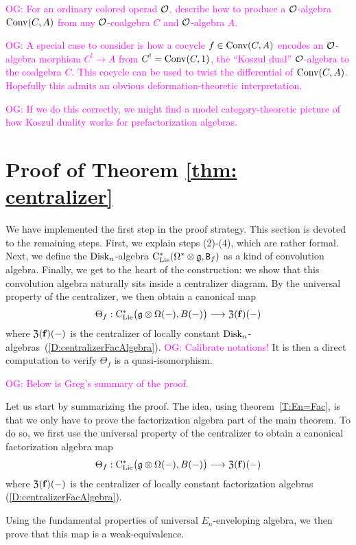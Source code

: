 \documentclass[11pt]{amsart}
\numberwithin{equation}{section}
\def\owen{\textcolor{magenta}{OG: }\textcolor{magenta}}
\begin{document}
\def\conv{{\rm Conv}}

\owen{For an ordinary colored operad $\mathcal O$, describe how to produce a $\mathcal O$-algebra $\conv(C,A)$ from any $\mathcal O$-coalgebra $C$ and $\mathcal O$-algebra $A$.}

\owen{A special case to consider is how a cocycle $f \in \conv(C,A)$ encodes an $\mathcal O$-algebra morphism $C^! \to A$ from $C^! = \conv(C,1)$, the ``Koszul dual'' $\mathcal O$-algebra to the coalgebra $C$. This cocycle can be used to twist the differential of $\conv(C,A)$. Hopefully this admits an obvious deformation-theoretic interpretation.}

\owen{If we do this correctly, we might find a model category-theoretic picture of how Koszul duality works for prefactorization algebras.}

\section{Proof of Theorem \ref{thm: centralizer}}

We have implemented the first step in the proof strategy.
This section is devoted to the remaining steps.
First, we explain steps (2)-(4), which are rather formal.
Next, we define the ${\rm Disk}_n$-algebra ${\rm C}_{\rm Lie}^*(\Omega^* \otimes \mathfrak g, {\tt B}_f)$ as a kind of convolution algebra.
Finally, we get to the heart of the construction:
we show that this convolution algebra naturally sits inside a centralizer diagram.
By the universal property of the centralizer, we then obtain 
a canonical map 
\[
\Theta_f: {\rm C}_{\rm Lie}^*\big(\mathfrak g\otimes \Omega (-), B(-) \big) \longrightarrow  {\frak Z}(\mathbf{f})(-)
\]
where ${\frak Z}(\mathbf{f})(-)$ is the centralizer of locally constant ${\rm Disk}_n$-algebras~(\ref{D:centralizerFacAlgebra}).
\owen{Calibrate notations!}
It is then a direct computation to verify $\Theta_f$ is a quasi-isomorphism.

\owen{Below is Greg's summary of the proof.}

Let us start by summarizing the proof. The idea, using theorem~\ref{T:En=Fac}, 
is that we only have to prove the factorization algebra part of the main theorem. 
To do so, we first use the universal property of the centralizer to obtain 
a canonical factorization algebra map 
\[\Theta_f: {\rm C}_{\rm Lie}^*\big(\mathfrak g\otimes \Omega (-), B(-) \big) \longrightarrow  {\frak Z}(\mathbf{f})(-)\]
where ${\frak Z}(\mathbf{f})(-)$ is the centralizer of locally constant factorization algebras (\ref{D:centralizerFacAlgebra}).


Using the fundamental properties of universal $E_n$-enveloping algebra, we then prove that 
this map is a weak-equivalence. 
\end{document}
